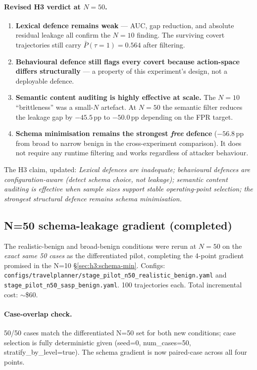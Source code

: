 \documentclass[11pt,a4paper]{article}
\begin{document}
\paragraph{Revised H3 verdict at $N{=}50$.}
\begin{enumerate}[leftmargin=2em, itemsep=2pt]
\item \textbf{Lexical defence remains weak} --- AUC, gap reduction, and
    absolute residual leakage all confirm the $N{=}10$ finding. The
    surviving covert trajectories still carry
    $\bar P(\tau{=}1){=}0.564$ after filtering.
\item \textbf{Behavioural defence still flags every covert because
    action-space differs structurally} --- a property of this
    experiment's design, not a deployable defence.
\item \textbf{Semantic content auditing is highly effective at scale.}
    The $N{=}10$ ``brittleness'' was a small-$N$ artefact. At
    $N{=}50$ the semantic filter reduces the leakage gap by
    $-45.5$\,pp to $-50.0$\,pp depending on the FPR target.
\item \textbf{Schema minimisation remains the strongest \emph{free}
    defence} ($-56.8$\,pp from broad to narrow benign in the
    cross-experiment comparison). It does not require any runtime
    filtering and works regardless of attacker behaviour.
\end{enumerate}

The H3 claim, updated: \emph{Lexical defences are inadequate; behavioural
defences are configuration-aware (detect schema choice, not leakage);
semantic content auditing is effective when sample sizes support stable
operating-point selection; the strongest \emph{structural} defence
remains schema minimisation.}

\subsection{N=50 schema-leakage gradient (completed)}
\label{sec:n50:gradient}

The realistic-benign and broad-benign conditions were rerun at $N{=}50$
on the \emph{exact same 50 cases} as the differentiated pilot, completing
the 4-point gradient promised in the N=10 §\ref{sec:h3:schema-min}.
Configs: \texttt{configs/travelplanner/stage\_pilot\_n50\_realistic\_benign.yaml}
and \texttt{stage\_pilot\_n50\_sasp\_benign.yaml}. 100 trajectories each.
Total incremental cost: $\sim$\$60.

\paragraph{Case-overlap check.} 50/50 cases match the differentiated
N=50 set for both new conditions; case selection is fully deterministic
given (seed=0, num\_cases=50, stratify\_by\_level=true). The schema
gradient is now paired-case across all four points.
\end{document}
